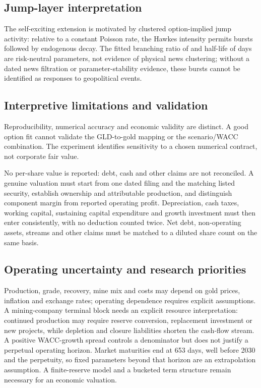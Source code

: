 \subsection{Jump-layer interpretation}
The self-exciting extension is motivated by clustered option-implied jump activity: relative to a constant Poisson rate, the Hawkes intensity permits bursts followed by endogenous decay. The fitted branching ratio of \HawkesBranching{} and half-life of \HawkesHalfLifeDays{} days are risk-neutral parameters, not evidence of physical news clustering; without a dated news filtration or parameter-stability evidence, these bursts cannot be identified as responses to geopolitical events.

\subsection{Interpretive limitations and validation}
Reproducibility, numerical accuracy and economic validity are distinct. A good option fit cannot validate the GLD-to-gold mapping or the scenario/WACC combination. The experiment identifies sensitivity to a chosen numerical contract, not corporate fair value.

No per-share value is reported: debt, cash and other claims are not reconciled. A genuine valuation must start from one dated filing and the matching listed security, establish ownership and attributable production, and distinguish component margin from reported operating profit. Depreciation, cash taxes, working capital, sustaining capital expenditure and growth investment must then enter consistently, with no deduction counted twice. Net debt, non-operating assets, streams and other claims must be matched to a diluted share count on the same basis.

\subsection{Operating uncertainty and research priorities}
Production, grade, recovery, mine mix and costs may depend on gold prices, inflation and exchange rates; operating dependence requires explicit assumptions. A mining-company terminal block needs an explicit resource interpretation: continued production may require reserve conversion, replacement investment or new projects, while depletion and closure liabilities shorten the cash-flow stream. A positive WACC-growth spread controls a denominator but does not justify a perpetual operating horizon. Market maturities end at 653 days, well before 2030 and the perpetuity, so fixed parameters beyond that horizon are an extrapolation assumption. A finite-reserve model and a bucketed term structure remain necessary for an economic valuation.



\begingroup
\setlength{\bibsep}{0.6pt}
\fontsize{6.75}{7.75}\selectfont

\endgroup
